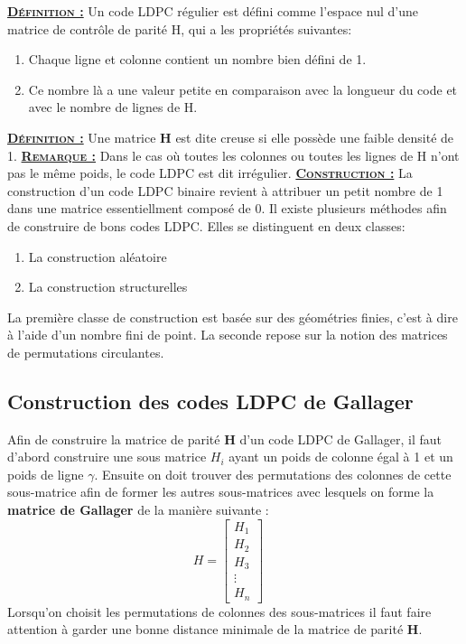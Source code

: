 \documentclass[french,nochapter,11pt]{rapportUB}
\begin{document}
\textsc{\textbf{\underline{Définition :}}} Un code LDPC régulier est défini comme l'espace nul d'une matrice de contrôle de parité H, qui a les propriétés suivantes:
\begin{enumerate}
  \item Chaque ligne et colonne contient un nombre bien défini de 1.
  \item Ce nombre là a une valeur petite en comparaison avec la longueur du code et avec le nombre de lignes de H.
\end{enumerate}
\vspace{0.4cm}
\textsc{\textbf{\underline{Définition :}}} Une matrice \textbf{H} est dite creuse si elle possède une faible densité de 1.\vspace{0.4cm}\newline
\textsc{\textbf{\underline{Remarque :}}} Dans le cas où toutes les colonnes ou toutes les lignes de H n'ont pas le même poids, le code LDPC est dit irrégulier.\vspace{0.4cm}\newline
\textsc{\textbf{\underline{Construction :}}} La construction d'un code LDPC binaire revient à attribuer un petit nombre de 1 dans une matrice essentiellment composé de 0. Il existe
plusieurs méthodes afin de construire de bons codes LDPC. Elles se distinguent en deux classes:
\begin{enumerate}
  \item La construction aléatoire
  \item La construction structurelles
\end{enumerate}
La première classe de construction est basée sur des géométries finies, c'est à dire à l'aide d'un nombre fini de point. La seconde repose sur la notion des matrices de 
permutations circulantes.\vspace{0.4cm}
\subsection{Construction des codes LDPC de Gallager}
Afin de construire la matrice de parité \textbf{H} d'un code LDPC de Gallager, il faut d'abord construire une sous matrice \textbf{$H_i$} ayant un poids de colonne égal à 
1 et un poids de ligne $\gamma$. Ensuite on doit trouver des permutations des colonnes de cette sous-matrice afin de former les autres sous-matrices avec lesquels on forme 
la \textbf{matrice de Gallager} de la manière suivante :
$$H=
\begin{bmatrix}
  H_1 \\
  H_2 \\
  H_3 \\
  \vdots \\
  H_n
\end{bmatrix}
\quad
$$
\newline
Lorsqu'on choisit les permutations de colonnes des sous-matrices il faut faire attention à garder une bonne distance minimale de la matrice de parité \textbf{H}.
\clearpage
\end{document}
